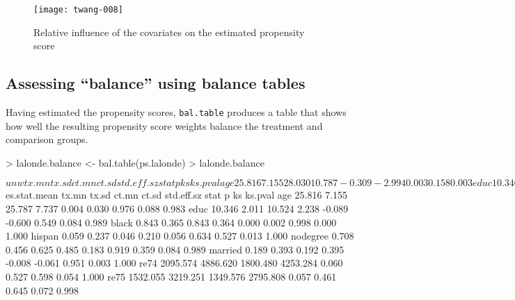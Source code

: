 \documentclass{article}
\begin{document}
\begin{figure}
\begin{center}
\texttt{[image: twang-008]}
\end{center}
\caption{Relative influence of the covariates on the estimated propensity score}
\label{fig:relativeinfluence}
\end{figure}

\subsection{Assessing ``balance'' using balance tables}
Having estimated the propensity scores, \texttt{bal.table} produces a table
that shows how well the resulting propensity score weights balance the
treatment and comparison groups.


\begin{Schunk}
\begin{Sinput}
> lalonde.balance <- bal.table(ps.lalonde)
> lalonde.balance
\end{Sinput}
\begin{Soutput}
$unw
            tx.mn    tx.sd    ct.mn    ct.sd std.eff.sz   stat     p    ks ks.pval
age        25.816    7.155   28.030   10.787     -0.309 -2.994 0.003 0.158   0.003
educ       10.346    2.011   10.235    2.855      0.055  0.547 0.584 0.111   0.075
black       0.843    0.365    0.203    0.403      1.757 19.371 0.000 0.640   0.000
hispan      0.059    0.237    0.142    0.350     -0.349 -3.413 0.001 0.083   0.319
nodegree    0.708    0.456    0.597    0.491      0.244  2.716 0.007 0.111   0.075
married     0.189    0.393    0.513    0.500     -0.824 -8.607 0.000 0.324   0.000
re74     2095.574 4886.620 5619.237 6788.751     -0.721 -7.254 0.000 0.447   0.000
re75     1532.055 3219.251 2466.484 3291.996     -0.290 -3.282 0.001 0.288   0.000

$es.stat.mean
            tx.mn    tx.sd    ct.mn    ct.sd std.eff.sz   stat     p    ks ks.pval
age        25.816    7.155   25.787    7.737      0.004  0.030 0.976 0.088   0.983
educ       10.346    2.011   10.524    2.238     -0.089 -0.600 0.549 0.084   0.989
black       0.843    0.365    0.843    0.364      0.000  0.002 0.998 0.000   1.000
hispan      0.059    0.237    0.046    0.210      0.056  0.634 0.527 0.013   1.000
nodegree    0.708    0.456    0.625    0.485      0.183  0.919 0.359 0.084   0.989
married     0.189    0.393    0.192    0.395     -0.008 -0.061 0.951 0.003   1.000
re74     2095.574 4886.620 1800.480 4253.284      0.060  0.527 0.598 0.054   1.000
re75     1532.055 3219.251 1349.576 2795.808      0.057  0.461 0.645 0.072   0.998


\end{Soutput}
\end{Schunk}
\end{document}

